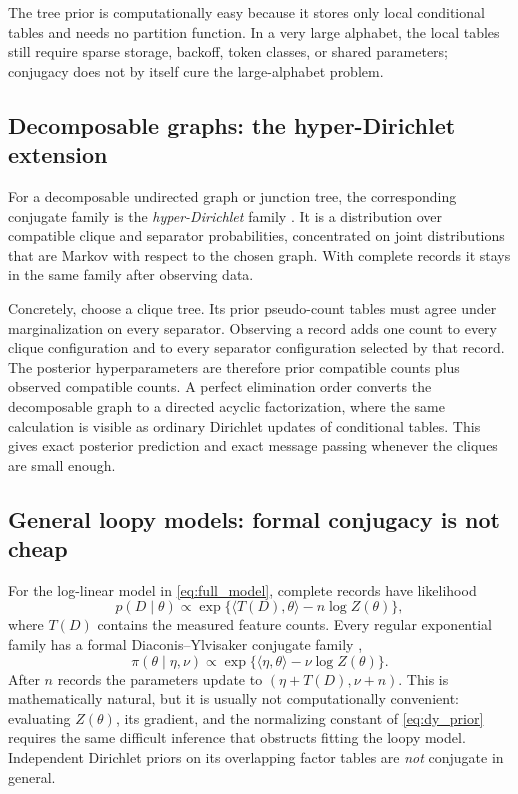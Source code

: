 \documentclass[11pt]{article}
\newcommand{\1}{\mathbf 1}
\begin{document}
The tree prior is computationally easy because it stores only local
conditional tables and needs no partition function.  In a very large alphabet,
the local tables still require sparse storage, backoff, token classes, or
shared parameters; conjugacy does not by itself cure the large-alphabet
problem.

\subsection{Decomposable graphs: the hyper-Dirichlet extension}

For a decomposable undirected graph or junction tree, the corresponding
conjugate family is the \emph{hyper-Dirichlet} family
\cite{dawid_lauritzen}.  It is a distribution over compatible clique and
separator probabilities, concentrated on joint distributions that are Markov
with respect to the chosen graph.  With complete records it stays in the same
family after observing data.

Concretely, choose a clique tree.  Its prior pseudo-count tables must agree
under marginalization on every separator.  Observing a record adds one count
to every clique configuration and to every separator configuration selected by
that record.  The posterior hyperparameters are therefore prior compatible
counts plus observed compatible counts.  A perfect elimination order converts
the decomposable graph to a directed acyclic factorization, where the same
calculation is visible as ordinary Dirichlet updates of conditional tables.
This gives exact posterior prediction and exact message passing whenever the
cliques are small enough.

\subsection{General loopy models: formal conjugacy is not cheap}

For the log-linear model in \eqref{eq:full_model}, complete records have
likelihood
\[
  p(D\mid\theta)
  \propto
  \exp\{\langle T(D),\theta\rangle-n\log Z(\theta)\},
\]
where \(T(D)\) contains the measured feature counts.  Every regular exponential
family has a formal Diaconis--Ylvisaker conjugate family
\cite{diaconis_ylvisaker},
\[
  \pi(\theta\mid\eta,\nu)
  \propto
  \exp\{\langle\eta,\theta\rangle-\nu\log Z(\theta)\}.
  \label{eq:dy_prior}
\]
After \(n\) records the parameters update to
\((\eta+T(D),\nu+n)\).  This is mathematically natural, but it is usually
not computationally convenient: evaluating \(Z(\theta)\), its gradient, and
the normalizing constant of \eqref{eq:dy_prior} requires the same difficult
inference that obstructs fitting the loopy model.  Independent Dirichlet
priors on its overlapping factor tables are \emph{not} conjugate in general.
\end{document}
